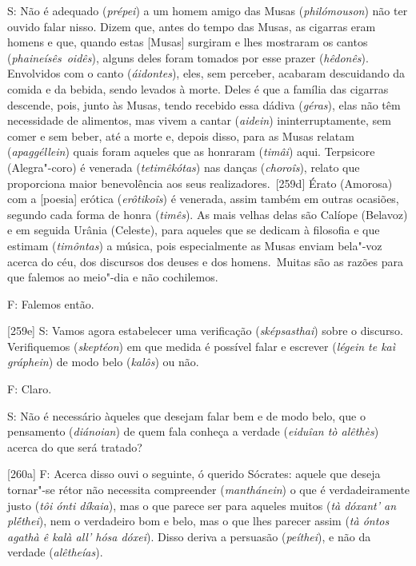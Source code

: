 S: Não é adequado (\emph{prépei}) a um homem amigo das Musas
(\emph{philómouson}) não ter ouvido falar nisso. Dizem que, antes do
tempo das Musas, as cigarras eram homens e que, quando estas [Musas]
surgiram e lhes mostraram os cantos (\emph{phaineísês}~\emph{oidês}),
alguns deles foram tomados por esse prazer (\emph{hêdonês}). Envolvidos
com o canto (\emph{áidontes}), eles, sem perceber, acabaram descuidando
da comida e da bebida, sendo levados à morte. Deles é que a família das
cigarras descende, pois, junto às Musas, tendo recebido essa dádiva
(\emph{géras}), elas não têm necessidade de alimentos, mas vivem a
cantar (\emph{aidein}) ininterruptamente, sem comer e sem beber, até a
morte e, depois disso, para as Musas relatam (\emph{apaggéllein}) quais
foram aqueles que as honraram (\emph{timâi}) aqui. Terpsicore
(Alegra"-coro) é venerada (\emph{tetimêkótas}) nas danças
(\emph{choroîs}), relato que proporciona maior benevolência aos seus
realizadores.~[259d] Érato (Amorosa) com a [poesia] erótica
(\emph{erôtikoîs}) é venerada, assim também em outras ocasiões, segundo
cada forma de honra (\emph{timês}). As mais velhas delas são Calíope
(Belavoz) e em seguida Urânia (Celeste), para aqueles que se dedicam à
filosofia e que estimam (\emph{timôntas}) a música, pois especialmente
as Musas enviam bela"-voz acerca do céu, dos discursos dos deuses e dos
homens.~Muitas são as razões para que falemos ao meio"-dia e não
cochilemos.

 

F: Falemos então.

 

[259e] S: Vamos agora estabelecer uma verificação
(\emph{sképsasthai}) sobre o discurso. Verifiquemos (\emph{skeptéon}) em
que medida é possível falar e escrever (\emph{légein te kaì gráphein})
de modo belo (\emph{kalôs}) ou não.

 

F: Claro.

 

S: Não é necessário àqueles que desejam falar bem e de modo belo, que o
pensamento (\emph{diánoian}) de quem fala conheça a verdade
(\emph{eiduîan tò alêthès}) acerca do que será tratado?

 

[260a] F: Acerca disso ouvi o seguinte, ó querido Sócrates: aquele
que deseja tornar"-se rétor não necessita compreender (\emph{manthánein})
o que é verdadeiramente justo (\emph{tôi ónti díkaia}), mas o que parece
ser para aqueles muitos (\emph{tà dóxant' an plḗthei}), nem o verdadeiro
bom e belo, mas o que lhes parecer assim (\emph{tà óntos agathà ê kalà
all' hósa dóxei}). Disso deriva a persuasão (\emph{peíthei}), e não da
verdade (\emph{alêtheías}).


